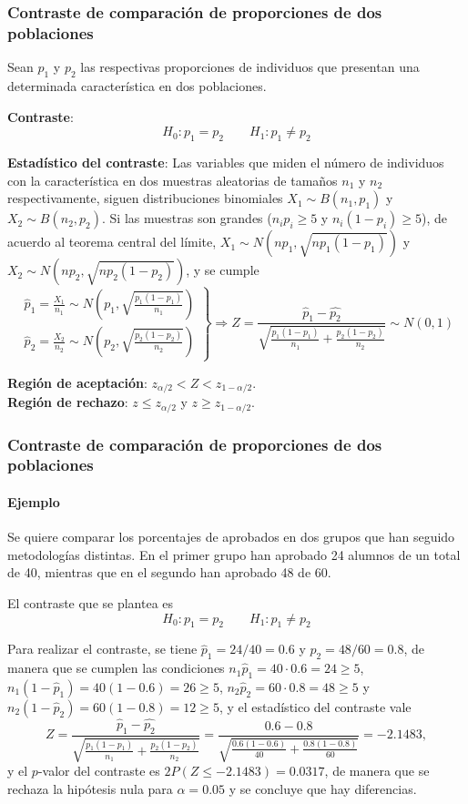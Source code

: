 \begin{frame}
\frametitle{Contraste de comparación de proporciones de dos poblaciones}
Sean $p_1$ y $p_2$ las respectivas proporciones de individuos que presentan una determinada característica en dos poblaciones.

\textbf{Contraste}:
\[
H_0: p_1=p_2\qquad
H_1: p_1\neq p_2
\]

\textbf{Estadístico del contraste}: Las variables que miden el número de individuos con la característica en dos muestras aleatorias de tamaños $n_1$ y $n_2$ respectivamente, siguen distribuciones binomiales $X_1\sim B(n_1,p_1)$ y $X_2\sim B(n_2,p_2)$. Si las muestras son grandes ($n_ip_i\geq 5$ y $n_i(1-p_i)\geq 5$), de acuerdo al teorema central del límite, $X_1\sim N(np_1,\sqrt{np_1(1-p_1)})$ y $X_2\sim N(np_2,\sqrt{np_2(1-p_2)})$, y se cumple
{%
\[
\left.
\begin{array}{l}
\hat{p}_1=\frac{X_1}{n_1} \sim N\left(p_1,\sqrt{\frac{p_1(1-p_1)}{n_1}}\right)\\
\hat{p}_2=\frac{X_2}{n_2} \sim N\left(p_2,\sqrt{\frac{p_2(1-p_2)}{n_2}}\right)
\end{array}
\right\}
\Rightarrow Z = \frac{\hat{p}_1-\hat{p_2}}{\sqrt{\frac{p_1(1-p_1)}{n_1}+\frac{p_2(1-p_2)}{n_2}}}\sim N(0,1)
\]
}

\textbf{Región de aceptación}: $z_{\alpha/2}< Z < z_{1-\alpha/2}$.\\
\textbf{Región de rechazo}: $z\leq z_{\alpha/2}$ y $z\geq z_{1-\alpha/2}$.
\end{frame}


\begin{frame}
\frametitle{Contraste de comparación de proporciones de dos poblaciones}
\framesubtitle{Ejemplo}
Se quiere comparar los porcentajes de aprobados en dos grupos que han seguido metodologías distintas.
En el primer grupo han aprobado 24 alumnos de un total de 40, mientras que en el segundo han aprobado 48 de 60.

El contraste que se plantea es
\[
H_0: p_1=p_2\qquad
H_1: p_1\neq p_2
\]

Para realizar el contraste, se tiene $\hat{p}_1=24/40= 0.6$ y $\hat{p}_2=48/60=0.8$, de manera que se cumplen las condiciones $n_1\hat{p}_1=40\cdot 0.6=24\geq 5$, $n_1(1-\hat{p}_1)=40(1-0.6)=26\geq 5$, $n_2\hat{p}_2=60\cdot 0.8=48\geq 5$ y $n_2(1-\hat{p}_2)=60(1-0.8)=12\geq 5$, y el estadístico del contraste vale
\[
Z = \frac{\hat{p}_1-\hat{p_2}}{\sqrt{\frac{p_1(1-p_1)}{n_1}+\frac{p_2(1-p_2)}{n_2}}} = \frac{0.6-0.8}{\sqrt{\frac{0.6(1-0.6)}{40}+\frac{0.8(1-0.8)}{60}}} = -2.1483,
\]
y el $p$-valor del contraste es $2P(Z\leq -2.1483)= 0.0317$, de manera que se rechaza la hipótesis nula para $\alpha=0.05$ y se concluye que hay diferencias.
\end{frame}


